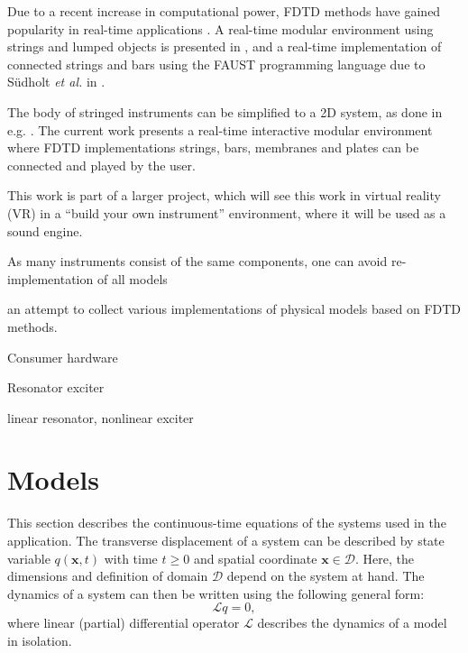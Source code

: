\documentclass{article}
\begin{document}
Due to a recent increase in computational power, FDTD methods have gained popularity in real-time applications \cite{WillemsenThesis}. A real-time modular environment using strings and lumped objects is presented in \cite{Bilbao2019}, and a real-time implementation of connected strings and bars using the FAUST programming language due to S\"udholt \textit{et al.} in \cite{Sudholt2021}. 

The body of stringed instruments can be simplified to a 2D system, as done in e.g. \cite{Willemsen2019, Willemsen2020}. The current work presents a real-time interactive modular environment where FDTD implementations strings, bars, membranes and plates can be connected and played by the user. 

This work is part of a larger project, which will see this work in virtual reality (VR) in a ``build your own instrument'' environment, where it will be used as a sound engine.

As many instruments consist of the same components, one can avoid re-implementation of all models 

an attempt to collect various implementations of physical models based on FDTD methods. 


Consumer hardware 


Resonator exciter \cite{Borin1989}

linear resonator, nonlinear exciter




\section{Models}\label{sec:models}
This section describes the continuous-time equations of the systems used in the application. The transverse displacement of a system can be described by state variable $q(\boldsymbol{x}, t)$ with time $t\geq 0$ and spatial coordinate $\boldsymbol{x}\in \mathcal{D}$. Here, the dimensions and definition of domain $\mathcal{D}$ depend on the system at hand. The dynamics of a system can then be written using the following general form:
\begin{equation}\label{eq:generalForm}
    \mathcal{L}q = 0,
\end{equation}
where linear (partial) differential operator $\mathcal{L}$ describes the dynamics of a model in isolation.

\end{document}
